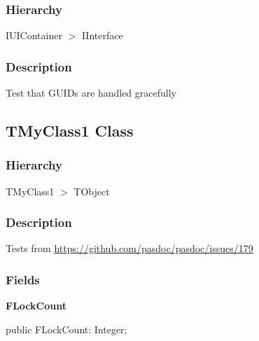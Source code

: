 \documentclass{report}
\newif\ifpdf
\begin{document}
\subsubsection*{\large{\textbf{Hierarchy}}\normalsize\hspace{1ex}\hfill}
IUIContainer {$>$} IInterface
\subsubsection*{\large{\textbf{Description}}\normalsize\hspace{1ex}\hfill}
Test that GUIDs are handled gracefully\ifpdf
\subsection*{\large{\textbf{TMyClass1 Class}}\normalsize\hspace{1ex}\hrulefill}
\else
\subsection*{TMyClass1 Class}
\fi
\label{ok_attributes.TMyClass1}
\subsubsection*{\large{\textbf{Hierarchy}}\normalsize\hspace{1ex}\hfill}
TMyClass1 {$>$} TObject
\subsubsection*{\large{\textbf{Description}}\normalsize\hspace{1ex}\hfill}
Tests from \href{https://github.com/pasdoc/pasdoc/issues/179}{https://github.com/pasdoc/pasdoc/issues/179}\subsubsection*{\large{\textbf{Fields}}\normalsize\hspace{1ex}\hfill}
\begin{list}{}{
\setlength{\itemindent}{0cm}
\setlength{\listparindent}{0cm}
\setlength{\leftmargin}{\evensidemargin}
\addtolength{\leftmargin}{\tmplength}
\settowidth{\labelsep}{X}
\addtolength{\leftmargin}{\labelsep}
\setlength{\labelwidth}{\tmplength}
}
\label{ok_attributes.TMyClass1-FLockCount}
\item[\textbf{FLockCount}\hfill]
\ifpdf
\begin{flushleft}
\fi
\begin{ttfamily}
public FLockCount: Integer;\end{ttfamily}

\ifpdf
\end{flushleft}
\fi


\par  \end{list}
\ifpdf
\end{document}
